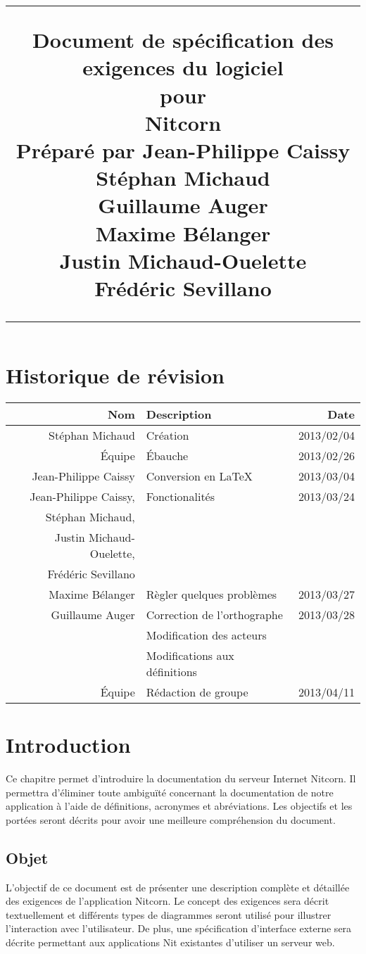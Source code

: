 \documentclass{scrreprt}
\title{%
\flushright
\rule{16cm}{5pt}\vskip1cm
\Huge{Document de spécification des exigences du logiciel}\\
\vspace{2cm}
pour\\
\vspace{2cm}
Nitcorn\\
\vspace{2cm}
Préparé par Jean-Philippe Caissy\\Stéphan Michaud\\Guillaume Auger\\Maxime
Bélanger\\Justin Michaud-Ouelette\\Frédéric Sevillano\\
\vfill
\rule{16cm}{5pt}
}
\date{}
\begin{document}
\maketitle
\tableofcontents
\chapter*{Historique de révision}
\begin{tabularx}{\textwidth}{|r|X|r|}
    \hline
    Nom & Description & Date \\
    \hline
    Stéphan Michaud & Création & 2013/02/04 \\
    \hline
    Équipe & Ébauche & 2013/02/26 \\
    \hline
    Jean-Philippe Caissy & Conversion en \LaTeX & 2013/03/04 \\
    \hline
    Jean-Philippe Caissy,& Fonctionalités & 2013/03/24\\
    Stéphan Michaud,& &\\
    Justin Michaud-Ouelette, & &\\
    Frédéric Sevillano & & \\
    \hline
    Maxime Bélanger & Règler quelques problèmes & 2013/03/27  \\
    \hline
    Guillaume Auger & Correction de l'orthographe & 2013/03/28  \\
     & Modification des acteurs &\\
     & Modifications aux définitions &\\
    \hline
    Équipe & Rédaction de groupe & 2013/04/11 \\
    \hline
\end{tabularx}

\chapter{Introduction}
Ce chapitre permet d'introduire la documentation du serveur Internet Nitcorn. Il permettra d'éliminer toute ambiguïté concernant la documentation
de notre application à l'aide de définitions, acronymes et
abréviations. Les objectifs et les portées seront décrits pour
avoir une meilleure compréhension du document.
\section{Objet}
L'objectif de ce document est de présenter une description complète et
détaillée des exigences de l'application Nitcorn. Le concept des exigences sera décrit textuellement et différents types de diagrammes seront utilisé pour illustrer l'interaction avec l'utilisateur. De plus, une spécification d'interface externe sera décrite permettant aux applications Nit existantes d'utiliser un serveur web.\\
\end{document}
